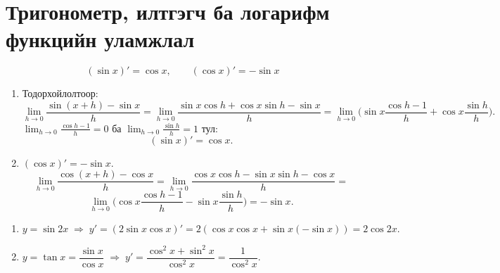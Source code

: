 \section{Тригонометр, илтгэгч ба логарифм функцийн уламжлал}

\begin{theorem}
\[
(\sin x)' = \cos x, \qquad (\cos x)' = -\sin x
\]
\end{theorem}
\begin{prof}
\begin{enumerate}
  \item  
  Тодорхойлолтоор:
  \[
  \lim_{h\to0}\frac{\sin(x+h)-\sin x}{h}
  =\lim_{h\to0}\frac{\sin x\cos h+\cos x\sin h-\sin x}{h}
  =\lim_{h\to0}\big(\sin x\frac{\cos h-1}{h}+\cos x\frac{\sin h}{h}\big).
  \]
  $\displaystyle \lim_{h\to0}\frac{\cos h-1}{h}=0$ ба $\displaystyle \lim_{h\to0}\frac{\sin h}{h}=1$ тул:
  \[
  (\sin x)'=\cos x.
  \]

  \item $(\cos x)'=-\sin x$.  
  $$
  \lim_{h\to0}\frac{\cos(x+h)-\cos x}{h}
  =\lim_{h\to0}\frac{\cos x\cos h-\sin x\sin h-\cos x}{h}
  =$$
  $$\lim_{h\to0}\big(\cos x\frac{\cos h-1}{h}-\sin x\frac{\sin h}{h}\big)
  =-\sin x.
  $$
\end{enumerate}
\end{prof}
\begin{example}
\begin{enumerate}
  \item $y=\sin 2x \;\Rightarrow\; y'=(2\sin x\cos x)'=2(\cos x\cos x+\sin x(-\sin x))=2\cos 2x.$
  \item $y=\tan x=\dfrac{\sin x}{\cos x} 
  \;\Rightarrow\; y'=\dfrac{\cos^2 x+\sin^2 x}{\cos^2 x}
  =\dfrac{1}{\cos^2 x}.$
\end{enumerate}
\end{example}

\begin{center}
\end{center}

